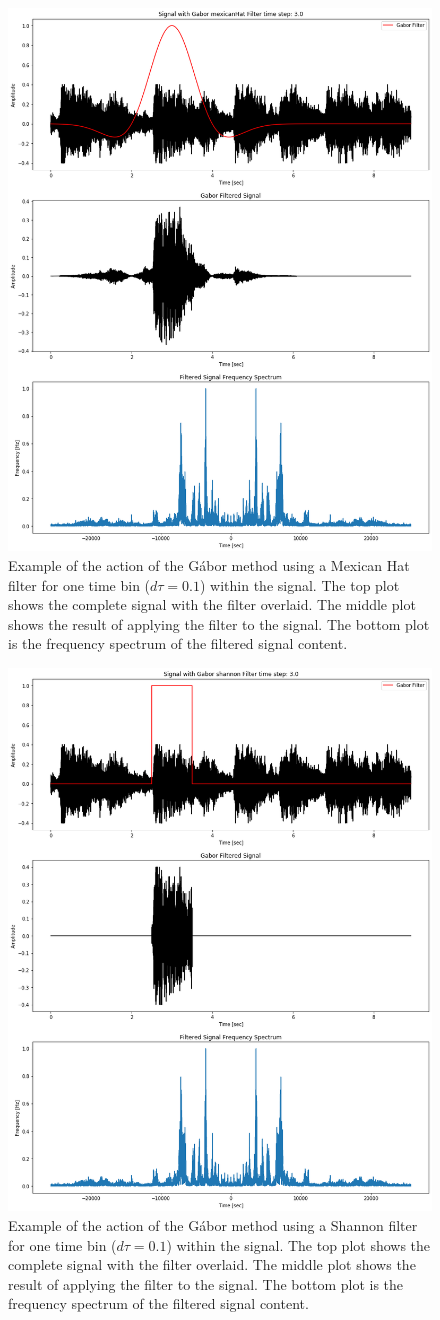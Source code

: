 \documentclass{article}
\begin{document}
\begin{figure}
    \centering
    \includegraphics[width=0.435\linewidth]{HW2_DanielBurnham_files/HW2_DanielBurnham_7_2.png}
    \caption{Example of the action of the G\'abor method using a Mexican Hat filter for one time bin ($d\tau = 0.1$) within the signal. The top plot shows the complete signal with the filter overlaid. The middle plot shows the result of applying the filter to the signal. The bottom plot is the frequency spectrum of the filtered signal content.}
    \label{fig:mexFilt}
\end{figure}
\begin{figure}
    \centering
    \includegraphics[width=0.435\linewidth]{HW2_DanielBurnham_files/HW2_DanielBurnham_10_2.png}
    \caption{Example of the action of the G\'abor method using a Shannon filter for one time bin ($d\tau = 0.1$) within the signal. The top plot shows the complete signal with the filter overlaid. The middle plot shows the result of applying the filter to the signal. The bottom plot is the frequency spectrum of the filtered signal content.}
    \label{fig:shanFilt}
\end{figure}
\end{document}
